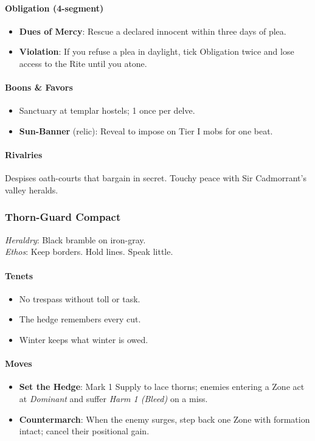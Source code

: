\documentclass[11pt,letterpaper]{article}
\begin{document}
\paragraph{Obligation (4-segment)}
\begin{itemize}[leftmargin=*]
\item \textbf{Dues of Mercy}: Rescue a declared innocent within three days of plea.
\item \textbf{Violation}: If you refuse a plea in daylight, tick Obligation twice and lose access to the Rite until you atone.
\end{itemize}

\paragraph{Boons \& Favors}
\begin{itemize}[leftmargin=*]
\item Sanctuary at templar hostels;  1 once per delve.
\item \textbf{Sun-Banner} (relic): Reveal to impose  on Tier I mobs for one beat.
\end{itemize}

\paragraph{Rivalries}
Despises oath-courts that bargain in secret. Touchy peace with Sir Cadmorrant's valley heralds.

\bigskip

\subsubsection{Thorn-Guard Compact}
\textit{Heraldry}: Black bramble on iron-gray.\\
\textit{Ethos}: Keep borders. Hold lines. Speak little.

\paragraph{Tenets}
\begin{itemize}[leftmargin=*]
\item No trespass without toll or task.
\item The hedge remembers every cut.
\item Winter keeps what winter is owed.
\end{itemize}

\paragraph{Moves}
\begin{itemize}[leftmargin=*]
\item \textbf{Set the Hedge}: Mark 1 Supply to lace thorns; enemies entering a Zone act at \textit{Dominant} and suffer \textit{Harm 1 (Bleed)} on a miss.
\item \textbf{Countermarch}: When the enemy surges, step back one Zone with formation intact; cancel their positional gain.
\end{itemize}
\end{document}
